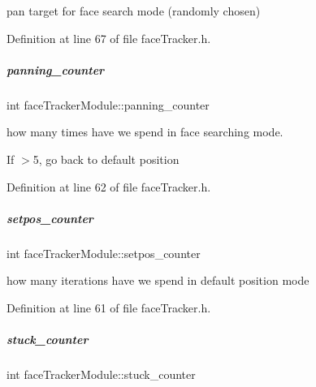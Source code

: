 pan target for face search mode (randomly chosen) 



Definition at line 67 of file face\+Tracker.\+h.

\mbox{\label{group__faceTracker_a179f88dc8e3e0db4e7a48cae4ad0cab0}} 
\subparagraph{\texorpdfstring{panning\+\_\+counter}{panning\_counter}}
{\footnotesize\ttfamily int face\+Tracker\+Module\+::panning\+\_\+counter\hspace{0.3cm}{\ttfamily [protected]}}



how many times have we spend in face searching mode. 

If $>$5, go back to default position 

Definition at line 62 of file face\+Tracker.\+h.

\mbox{\label{group__faceTracker_af571d0f0d12556b700e396d0e3349838}} 
\subparagraph{\texorpdfstring{setpos\+\_\+counter}{setpos\_counter}}
{\footnotesize\ttfamily int face\+Tracker\+Module\+::setpos\+\_\+counter\hspace{0.3cm}{\ttfamily [protected]}}



how many iterations have we spend in default position mode 



Definition at line 61 of file face\+Tracker.\+h.

\mbox{\label{group__faceTracker_a91894c7458dbcc569a7a5504fff41d63}} 
\subparagraph{\texorpdfstring{stuck\+\_\+counter}{stuck\_counter}}
{\footnotesize\ttfamily int face\+Tracker\+Module\+::stuck\+\_\+counter\hspace{0.3cm}{\ttfamily [protected]}}



